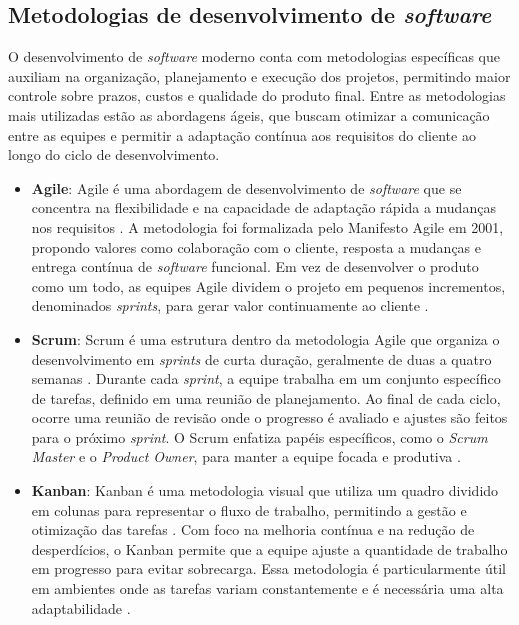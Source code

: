 \subsection{Metodologias de desenvolvimento de \textit{software}}

O desenvolvimento de \textit{software} moderno conta com metodologias específicas que auxiliam na organização, planejamento e execução dos projetos, permitindo maior controle sobre prazos, custos e qualidade do produto final. Entre as metodologias mais utilizadas estão as abordagens ágeis, que buscam otimizar a comunicação entre as equipes e permitir a adaptação contínua aos requisitos do cliente ao longo do ciclo de desenvolvimento.

\begin{itemize} \item \textbf{Agile}: Agile é uma abordagem de desenvolvimento de \textit{software} que se concentra na flexibilidade e na capacidade de adaptação rápida a mudanças nos requisitos \cite{agilemanif}. A metodologia foi formalizada pelo Manifesto Agile em 2001, propondo valores como colaboração com o cliente, resposta a mudanças e entrega contínua de \textit{software} funcional. Em vez de desenvolver o produto como um todo, as equipes Agile dividem o projeto em pequenos incrementos, denominados \textit{sprints}, para gerar valor continuamente ao cliente \cite{agilepractices}.

    \item \textbf{Scrum}: Scrum é uma estrutura dentro da metodologia Agile que organiza o desenvolvimento em \textit{sprints} de curta duração, geralmente de duas a quatro semanas \cite{scrumguide}. Durante cada \textit{sprint}, a equipe trabalha em um conjunto específico de tarefas, definido em uma reunião de planejamento. Ao final de cada ciclo, ocorre uma reunião de revisão onde o progresso é avaliado e ajustes são feitos para o próximo \textit{sprint}. O Scrum enfatiza papéis específicos, como o \textit{Scrum Master} e o \textit{Product Owner}, para manter a equipe focada e produtiva \cite{scrumroles}.

	\item \textbf{Kanban}: Kanban é uma metodologia visual que utiliza um quadro dividido em colunas para representar o fluxo de trabalho, permitindo a gestão e otimização das tarefas \cite{kanbanmethod}. Com foco na melhoria contínua e na redução de desperdícios, o Kanban permite que a equipe ajuste a quantidade de trabalho em progresso para evitar sobrecarga. Essa metodologia é particularmente útil em ambientes onde as tarefas variam constantemente e é necessária uma alta adaptabilidade \cite{kanbanflow}.


\end{itemize}
